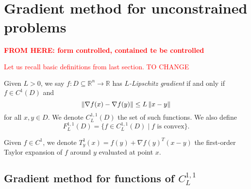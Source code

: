 %
%
%

%
%
%
%
%





\section{Gradient method for unconstrained problems}

\textbf{\textcolor{red}{FROM HERE: form controlled, contained te be controlled}}

\textcolor{red}{Let us recall basic definitions from last section. TO CHANGE}

\begin{definition}
Given $L>0$, we say $f : D \subseteq \mathbb{R}^n \to \mathbb{R}$ has \emph{$L$-Lipschitz gradient} if and only if $f \in C^1(D)$ and
\begin{equation*}
\left\Vert \nabla f(x) - \nabla f(y) \right\Vert \le L \left\Vert x-y \right\Vert
\end{equation*}
for all $x,y \in D$. We denote $C_L^{1,1}(D)$ the set of such functions. We also define
\begin{equation*}
F_L^{1,1}(D) = \{ f \in C_L^{1,1}(D) \mid f \text{ is convex}\} .
\end{equation*}
\end{definition}

Given $f \in C^1$, we denote $T^1_y(x) = f(y) + \nabla f(y)^T (x-y)$ the first-order Taylor expansion of $f$ around $y$ evaluated at point $x$.

\subsection{Gradient method for functions of $C_L^{1,1}$}

